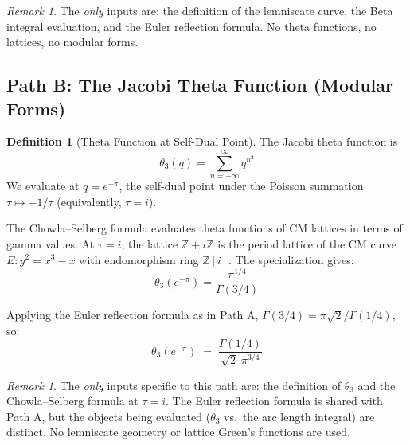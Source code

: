 \documentclass[12pt]{article}
\theoremstyle{definition}
\newtheorem{definition}[theorem]{Definition}
\theoremstyle{remark}
\newtheorem{remark}[theorem]{Remark}
\begin{document}
\begin{remark}
The \emph{only} inputs are: the definition of the lemniscate curve, the Beta integral evaluation, and the Euler reflection formula. No theta functions, no lattices, no modular forms.
\end{remark}

\subsection{Path B: The Jacobi Theta Function (Modular Forms)}

\begin{definition}[Theta Function at Self-Dual Point]
\label{def:theta}
The Jacobi theta function is
\begin{equation}
    \theta_3(q) = \sum_{n=-\infty}^{\infty} q^{n^2}
\end{equation}
We evaluate at $q = e^{-\pi}$, the self-dual point under the Poisson summation $\tau \mapsto -1/\tau$ (equivalently, $\tau = i$).
\end{definition}

The Chowla--Selberg formula \cite{chowla-selberg} evaluates theta functions of CM lattices in terms of gamma values. At $\tau = i$, the lattice $\mathbb{Z} + i\mathbb{Z}$ is the period lattice of the CM curve $E\!: y^2 = x^3 - x$ with endomorphism ring $\mathbb{Z}[i]$. The specialization gives:
\begin{equation}
    \theta_3(e^{-\pi}) = \frac{\pi^{1/4}}{\Gamma(3/4)}
    \label{eq:theta-raw}
\end{equation}

Applying the Euler reflection formula as in Path A, $\Gamma(3/4) = \pi\sqrt{2}/\Gamma(1/4)$, so:
\begin{equation}
    \boxed{\;\theta_3(e^{-\pi}) \;=\; \frac{\Gamma(1/4)}{\sqrt{2}\;\pi^{3/4}}\;}
    \label{eq:theta}
\end{equation}

\begin{remark}
The \emph{only} inputs specific to this path are: the definition of $\theta_3$ and the Chowla--Selberg formula at $\tau = i$. The Euler reflection formula is shared with Path A, but the objects being evaluated ($\theta_3$ vs.\ the arc length integral) are distinct. No lemniscate geometry or lattice Green's functions are used.
\end{remark}

\end{document}
